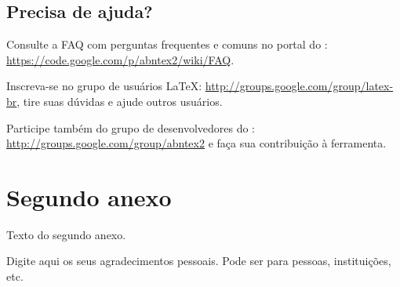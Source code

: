 \documentclass[article,12pt,oneside,a4paper,chapter=TITLE,english,brazil]{abntex2}
\begin{document}
\begin{anexosenv}
\section{Precisa de ajuda?}

Consulte a FAQ com perguntas frequentes e comuns no portal do \abnTeX: \url{https://code.google.com/p/abntex2/wiki/FAQ}.

Inscreva-se no grupo de usuários \LaTeX: \url{http://groups.google.com/group/latex-br}, tire suas dúvidas e ajude outros usuários.

Participe também do grupo de desenvolvedores do \abnTeX: \url{http://groups.google.com/group/abntex2} e faça sua contribuição à ferramenta.
\vspace{\onelineskip}


\chapter{Segundo anexo}

Texto do segundo anexo.

\end{anexosenv}


\newpage
\begin{agradecimentos}
	Digite aqui os seus agradecimentos pessoais. Pode ser para pessoas,
	instituições, etc.
\end{agradecimentos}


\printindex
\end{document}
